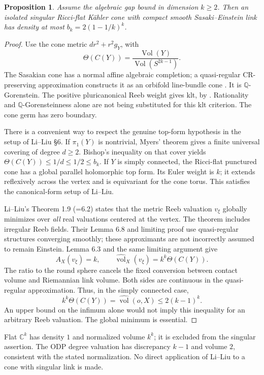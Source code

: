 \documentclass[11pt]{article}
\newtheorem{proposition}{Proposition}
\newcommand{\nv}{\widehat{\operatorname{vol}}}
\newcommand{\C}{\mathbb C}
\newcommand{\Q}{\mathbb Q}
\begin{document}
\begin{proposition}
Assume the algebraic gap bound in dimension $k\geq2$. Then an isolated
singular Ricci-flat K\"ahler cone with compact smooth Sasaki--Einstein
link has density at most $b_k=2(1-1/k)^k$.
\end{proposition}
\begin{proof}
Use the cone metric $dr^2+r^2g_Y$, with
\[
 \Theta(C(Y))=\frac{\operatorname{Vol}(Y)}{\operatorname{Vol}(S^{2k-1})}.
\]
The Sasakian cone has a normal affine algebraic completion; a
quasi-regular CR-preserving approximation constructs it as an orbifold
line-bundle cone \cite[\S3]{vC}. It is $\Q$-Gorenstein. The positive
pluricanonical Reeb weight gives klt, by
\cite[Lemma 6.1]{CS}. Rationality and $\Q$-Gorensteinness alone are not
being substituted for this klt criterion. The cone germ has zero boundary.

There is a convenient way to respect the genuine top-form hypothesis in
the setup of Li--Liu \S6. If $\pi_1(Y)$ is nontrivial, Myers' theorem
gives a finite universal covering of degree $d\geq2$. Bishop's inequality
on that cover yields $\Theta(C(Y))\leq1/d\leq1/2\leq b_k$.
If $Y$ is simply connected, the Ricci-flat punctured cone has a global
parallel holomorphic top form. Its Euler weight is $k$; it extends
reflexively across the vertex and is equivariant for the cone torus.
This satisfies the canonical-form setup of Li--Liu.

Li--Liu's Theorem 1.9 (=6.2) states that the metric Reeb valuation
$v_\xi$ globally minimizes over \emph{all} real valuations centered at
the vertex. The theorem includes irregular Reeb fields. Their Lemma 6.8
and limiting proof use quasi-regular structures converging smoothly;
these approximants are not incorrectly assumed to remain Einstein.
Lemma 6.3 and the same limiting argument give
\[
 A_X(v_\xi)=k,\qquad
 \nv_X(v_\xi)=k^k\Theta(C(Y)).
\]
The ratio to the round sphere cancels the fixed conversion between contact
volume and Riemannian link volume. Both sides are continuous in the
quasi-regular approximation. Thus, in the simply connected case,
\[
 k^k\Theta(C(Y))=\nv(o,X)\leq2(k-1)^k.
\]
An upper bound on the infimum alone would not imply this inequality for
an arbitrary Reeb valuation. The global minimum is essential.
\end{proof}

Flat $\C^k$ has density $1$ and normalized volume $k^k$; it is excluded
from the singular assertion. The ODP degree valuation has discrepancy
$k-1$ and volume $2$, consistent with the stated normalization. No direct
application of Li--Liu to a cone with singular link is made.
\end{document}
